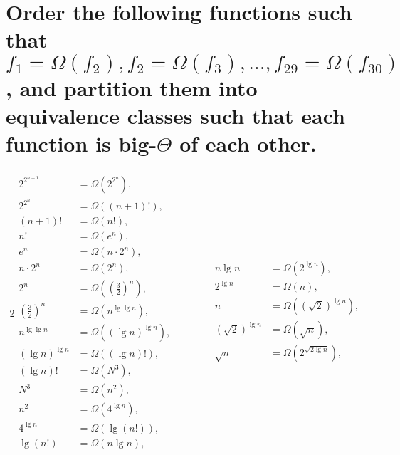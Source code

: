 \section[Problem 6]{Order the following functions such that $f_1 = \Omega(f_2), f_2 = \Omega(f_3), ..., f_{29} = \Omega(f_{30})$, and partition them into equivalence classes such that each function is big-$\Theta$ of each other.}

\begin{alignat*}{2}
	\begin{aligned}
		2^{2^{n + 1}} &= \Omega \left(2^{2^n} \right), \\
		2^{2^n} &= \Omega \left((n + 1)! \right), \\
		(n + 1)! &= \Omega \left(n! \right), \\
		n! &= \Omega \left(e^n \right), \\
		e^n &= \Omega \left(n \cdot 2^n \right), \\
		n \cdot 2^n &= \Omega \left(2^n \right), \\
		2^n &= \Omega \left(\left( \frac{3}{2} \right)^n \right), \\
		\left( \frac{3}{2} \right)^n &= \Omega \left(n^{\lg \lg n} \right), \\
		n^{\lg \lg n} &= \Omega \left(\left( \lg n \right)^{\lg n} \right), \\
		\left( \lg n \right)^{\lg n} &= \Omega \left((\lg n)! \right), \\
		(\lg n)! &= \Omega \left(N^3 \right), \\
		N^3 &= \Omega \left(n^2 \right), \\
		n^2 &= \Omega \left(4^{\lg n} \right), \\
		4^{\lg n} &= \Omega \left(\lg (n!) \right), \\
		\lg (n!)  &= \Omega \left(n \lg n \right), \\
	\end{aligned}
	& \qquad &
	\begin{aligned}
		n \lg n &= \Omega \left(2^{\lg n} \right), \\
		2^{\lg n} &= \Omega \left(n \right), \\
		n &= \Omega \left(\left( \sqrt{2} \right)^{\lg n} \right), \\
		\left( \sqrt{2} \right)^{\lg n} &= \Omega \left(\sqrt{n} \right), \\
		\sqrt{n} &= \Omega \left(2^{\sqrt{2 \lg n}} \right), \\

\end{aligned}
\end{alignat*}
